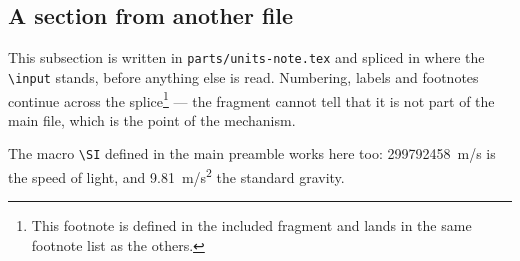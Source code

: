 \subsection{A section from another file}\label{sec:units}
This subsection is written in \texttt{parts/units-note.tex} and spliced in
where the \texttt{\textbackslash input} stands, before anything else is
read. Numbering, labels and footnotes continue across the
splice\footnote{This footnote is defined in the included fragment and lands
in the same footnote list as the others.} --- the fragment cannot tell that
it is not part of the main file, which is the point of the mechanism.

The macro \verb|\SI| defined in the main preamble works here too:
\SI{299792458}{m/s} is the speed of light, and \SI{9.81}{m/s^2} the
standard gravity.
